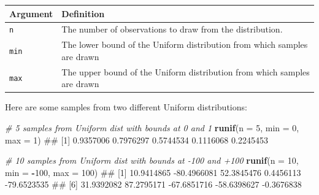 \documentclass[]{book}
\newenvironment{Shaded}{\begin{snugshade}}{\end{snugshade}}
\newcommand{\KeywordTok}[1]{\textcolor[rgb]{0.13,0.29,0.53}{\textbf{#1}}}
\newcommand{\DataTypeTok}[1]{\textcolor[rgb]{0.13,0.29,0.53}{#1}}
\newcommand{\DecValTok}[1]{\textcolor[rgb]{0.00,0.00,0.81}{#1}}
\newcommand{\CommentTok}[1]{\textcolor[rgb]{0.56,0.35,0.01}{\textit{#1}}}
\newcommand{\OperatorTok}[1]{\textcolor[rgb]{0.81,0.36,0.00}{\textbf{#1}}}
\newcommand{\NormalTok}[1]{#1}
\theoremstyle{definition}
\theoremstyle{definition}
\theoremstyle{remark}
\begin{document}
\begin{longtable}[]{@{}ll@{}}
\toprule
\begin{minipage}[b]{0.14\columnwidth}\raggedright\strut
Argument\strut
\end{minipage} & \begin{minipage}[b]{0.61\columnwidth}\raggedright\strut
Definition\strut
\end{minipage}\tabularnewline
\midrule
\endhead
\begin{minipage}[t]{0.14\columnwidth}\raggedright\strut
\texttt{n}\strut
\end{minipage} & \begin{minipage}[t]{0.61\columnwidth}\raggedright\strut
The number of observations to draw from the distribution.\strut
\end{minipage}\tabularnewline
\begin{minipage}[t]{0.14\columnwidth}\raggedright\strut
\texttt{min}\strut
\end{minipage} & \begin{minipage}[t]{0.61\columnwidth}\raggedright\strut
The lower bound of the Uniform distribution from which samples are
drawn\strut
\end{minipage}\tabularnewline
\begin{minipage}[t]{0.14\columnwidth}\raggedright\strut
\texttt{max}\strut
\end{minipage} & \begin{minipage}[t]{0.61\columnwidth}\raggedright\strut
The upper bound of the Uniform distribution from which samples are
drawn\strut
\end{minipage}\tabularnewline
\bottomrule
\end{longtable}

Here are some samples from two different Uniform distributions:

\begin{Shaded}
\begin{Highlighting}[]
\CommentTok{# 5 samples from Uniform dist with bounds at 0 and 1}
\KeywordTok{runif}\NormalTok{(}\DataTypeTok{n =} \DecValTok{5}\NormalTok{, }\DataTypeTok{min =} \DecValTok{0}\NormalTok{, }\DataTypeTok{max =} \DecValTok{1}\NormalTok{)}
\NormalTok{## [1] 0.9357006 0.7976297 0.5744534 0.1116068 0.2245453}

\CommentTok{# 10 samples from Uniform dist with bounds at -100 and +100}
\KeywordTok{runif}\NormalTok{(}\DataTypeTok{n =} \DecValTok{10}\NormalTok{, }\DataTypeTok{min =} \OperatorTok{-}\DecValTok{100}\NormalTok{, }\DataTypeTok{max =} \DecValTok{100}\NormalTok{)}
\NormalTok{##  [1]  10.9414865 -80.4966081  52.3845476   0.4456113 -79.6523535}
\NormalTok{##  [6]  31.9392082  87.2795171 -67.6851716 -58.6398627  -0.3676838}
\end{Highlighting}
\end{Shaded}
\end{document}
